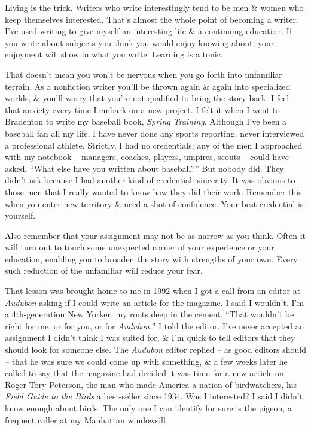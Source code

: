 \documentclass{article}
\numberwithin{equation}{section}
\begin{document}
Living is the trick. Writers who write interestingly tend to be men \& women who keep themselves interested. That's almost the whole point of becoming a writer. I've used writing to give myself an interesting life \& a continuing education. If you write about subjects you think you would enjoy knowing about, your enjoyment will show in what you write. Learning is a tonic.

That doesn't mean you won't be nervous when you go forth into unfamiliar terrain. As a nonfiction writer you'll be thrown again \& again into specialized worlds, \& you'll worry that you're not qualified to bring the story back. I feel that anxiety every time I embark on a new project. I felt it when I went to Bradenton to write my baseball book, \textit{Spring Training}. Although I've been a baseball fan all my life, I have never done any sports reporting, never interviewed a professional athlete. Strictly, I had no credentials; any of the men I approached with my notebook -- managers, coaches, players, umpires, scouts -- could have asked, ``What else have you written about baseball?'' But nobody did. They didn't ask because I had another kind of credential: sincerity. It was obvious to those men that I really wanted to know how they did their work. Remember this when you enter new territory \& need a shot of confidence. Your best credential is yourself.

Also remember that your assignment may not be as narrow as you think. Often it will turn out to touch some unexpected corner of your experience or your education, enabling you to broaden the story with strengths of your own. Every such reduction of the unfamiliar will reduce your fear.

That lesson was brought home to me in 1992 when I got a call from an editor at \textit{Audubon} asking if I could write an article for the magazine. I said I wouldn't. I'm a 4th-generation New Yorker, my roots deep in the cement. ``That wouldn't be right for me, or for you, or for \textit{Audubon},'' I told the editor. I've never accepted an assignment I didn't think I was suited for, \& I'm quick to tell editors that they should look for someone else. The \textit{Audubon} editor replied -- as good editors should -- that he was sure we could come up with something, \& a few weeks later he called to say that the magazine had decided it was time for a new article on Roger Tory Peterson, the man who made America a nation of birdwatchers, his \textit{Field Guide to the Birds} a best-seller since 1934. Was I interested? I said I didn't know enough about birds. The only one I can identify for sure is the pigeon, a frequent caller at my Manhattan windowsill.
\end{document}
